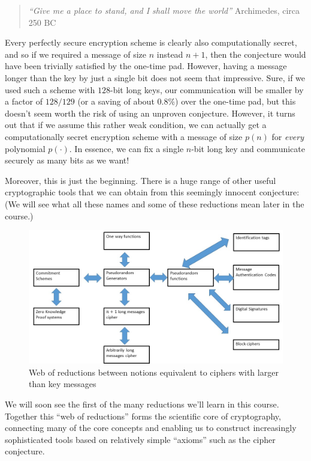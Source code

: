 \begin{quote}
\emph{``Give me a place to stand, and I shall move the world''}
Archimedes, circa 250 BC
\end{quote}

Every perfectly secure encryption scheme is clearly also computationally
secret, and so if we required a message of size \(n\) instead \(n+1\),
then the conjecture would have been trivially satisfied by the one-time
pad. However, having a message longer than the key by just a single bit
does not seem that impressive. Sure, if we used such a scheme with
\(128\)-bit long keys, our communication will be smaller by a factor of
\(128/129\) (or a saving of about \(0.8\%\)) over the one-time pad, but
this doesn't seem worth the risk of using an unproven conjecture.
However, it turns out that if we assume this rather weak condition, we
can actually get a computationally secret encryption scheme with a
message of size \(p(n)\) for \emph{every} polynomial \(p(\cdot)\). In
essence, we can fix a single \(n\)-bit long key and communicate securely
as many bits as we want!

Moreover, this is just the beginning. There is a huge range of other
useful cryptographic tools that we can obtain from this seemingly
innocent conjecture: (We will see what all these names and some of these
reductions mean later in the course.)


\begin{figure}
\centering
\includegraphics[width=\textwidth, height=0.25\paperheight, keepaspectratio]{../figure/privatekey-reduction-web.jpg}
\caption{Web of reductions between notions equivalent to ciphers with
larger than key messages}
\label{tmplabelfig}
\end{figure}

We will soon see the first of the many reductions we'll learn in this
course. Together this ``web of reductions'' forms the scientific core of
cryptography, connecting many of the core concepts and enabling us to
construct increasingly sophisticated tools based on relatively simple
``axioms'' such as the cipher conjecture.

